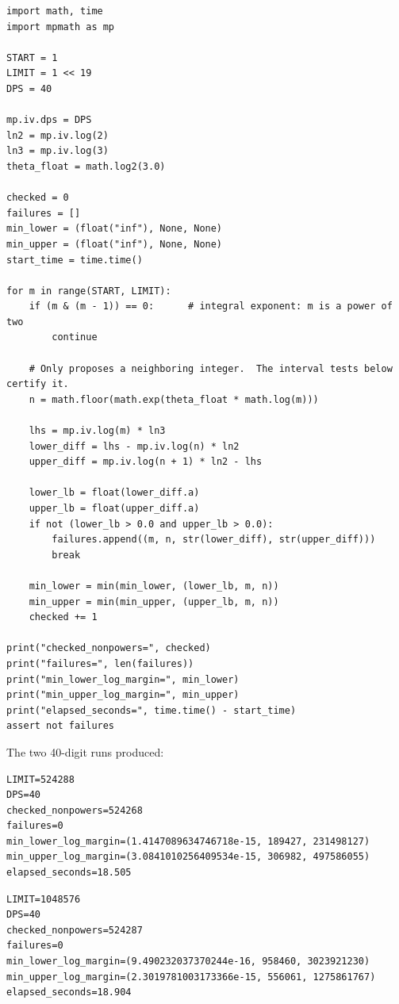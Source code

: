 \documentclass[11pt,oneside]{article}
\theoremstyle{definition}
\theoremstyle{remark}
\begin{document}
\begin{lstlisting}[style=pythonstyle,caption={Interval verification},label={ap:lst-interval}]
import math, time
import mpmath as mp

START = 1
LIMIT = 1 << 19
DPS = 40

mp.iv.dps = DPS
ln2 = mp.iv.log(2)
ln3 = mp.iv.log(3)
theta_float = math.log2(3.0)

checked = 0
failures = []
min_lower = (float("inf"), None, None)
min_upper = (float("inf"), None, None)
start_time = time.time()

for m in range(START, LIMIT):
    if (m & (m - 1)) == 0:      # integral exponent: m is a power of two
        continue

    # Only proposes a neighboring integer.  The interval tests below certify it.
    n = math.floor(math.exp(theta_float * math.log(m)))

    lhs = mp.iv.log(m) * ln3
    lower_diff = lhs - mp.iv.log(n) * ln2
    upper_diff = mp.iv.log(n + 1) * ln2 - lhs

    lower_lb = float(lower_diff.a)
    upper_lb = float(upper_diff.a)
    if not (lower_lb > 0.0 and upper_lb > 0.0):
        failures.append((m, n, str(lower_diff), str(upper_diff)))
        break

    min_lower = min(min_lower, (lower_lb, m, n))
    min_upper = min(min_upper, (upper_lb, m, n))
    checked += 1

print("checked_nonpowers=", checked)
print("failures=", len(failures))
print("min_lower_log_margin=", min_lower)
print("min_upper_log_margin=", min_upper)
print("elapsed_seconds=", time.time() - start_time)
assert not failures
\end{lstlisting}

The two 40-digit runs produced:

\begin{lstlisting}[style=pythonstyle,numbers=none,caption={Lower half output.}]
LIMIT=524288
DPS=40
checked_nonpowers=524268
failures=0
min_lower_log_margin=(1.4147089634746718e-15, 189427, 231498127)
min_upper_log_margin=(3.0841010256409534e-15, 306982, 497586055)
elapsed_seconds=18.505
\end{lstlisting}

\begin{lstlisting}[style=pythonstyle,numbers=none,caption={Upper half output.}]
LIMIT=1048576
DPS=40
checked_nonpowers=524287
failures=0
min_lower_log_margin=(9.490232037370244e-16, 958460, 3023921230)
min_upper_log_margin=(2.3019781003173366e-15, 556061, 1275861767)
elapsed_seconds=18.904
\end{lstlisting}
\end{document}
